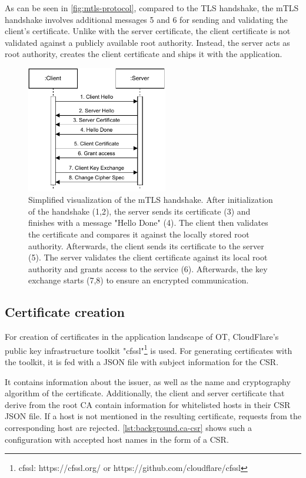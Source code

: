 As can be seen in \autoref{fig:mtls-protocol}, compared to the \ac{TLS} handshake, the \ac{mTLS} handshake involves additional messages 5 and 6 for sending and validating the client's certificate.
Unlike with the server certificate, the client certificate is not validated against a publicly available root authority. Instead, the server acts as root authority, creates the client certificate and ships it with the application.


\begin{figure}[h]
	\centering
	\includegraphics[width=0.55\textwidth]{Figures/mtls.pdf}
	\caption{Simplified visualization of the \ac{mTLS} handshake. After initialization of the handshake (1,2), the server sends its certificate (3) and finishes with a message "Hello Done" (4). The client then validates the certificate and compares it against the locally stored root authority. Afterwards, the client sends its certificate to the server (5). The server validates the client certificate against its local root authority and grants access to the service (6). Afterwards, the key exchange starts (7,8) to ensure an encrypted communication.}
	\label{fig:mtls-protocol}
\end{figure}

\subsection{Certificate creation}
For creation of certificates in the application landscape of \ac{OT}, CloudFlare's public key infrastructure toolkit "cfssl"\footnote{cfssl: https://cfssl.org/ or https://github.com/cloudflare/cfssl} is used.
For generating certificates with the toolkit, it is fed with a JSON file with subject information for the \ac{CSR}.

It contains information about the issuer, as well as the name and cryptography algorithm of the certificate.
Additionally, the client and server certificate that derive from the root \ac{CA} contain information for whitelisted hosts in their \ac{CSR} JSON file. If a host is not mentioned in the resulting certificate, requests from the corresponding host are rejected.
\autoref{lst:background.ca-csr} shows such a configuration with accepted host names in the form of a \ac{CSR}.

